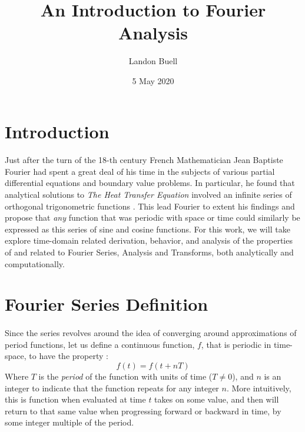 \documentclass[12pt,letterpaper]{article}
\begin{document}
\title{An Introduction to Fourier Analysis}
\author{Landon Buell}
\date{5 May 2020}
\maketitle


\section*{Introduction}
\paragraph*{}Just after the turn of the 18-th century French Mathematician Jean Baptiste Fourier had spent a great deal of his time in the subjects of various partial differential equations and boundary value problems. In particular, he found that analytical solutions to \textit{The Heat Transfer Equation} involved an infinite series of orthogonal trigonometric functions \cite{Pinsky,Olver}. This lead Fourier to extent his findings and propose that \textit{any} function that was periodic with space or time could similarly be expressed as this series of sine and cosine functions. For this work, we will take explore time-domain related derivation, behavior, and analysis of the properties of and related to Fourier Series, Analysis and Transforms, both analytically and computationally.



\section*{Fourier Series Definition}
\paragraph{}Since the series revolves around the idea of converging around approximations of period functions, let us define a continuous function, 
$f$, that is periodic in time-space, to have the property \cite{Tolstov}:
\begin{equation}
\label{periodic definition}
f(t) = f(t + nT)
\end{equation}
Where $T$ is the \textit{period} of the function with units of time ($T \neq 0$), and $n$ is an integer to indicate that the function repeats for any integer $n$. More intuitively, this is function when evaluated at time $t$ takes on some value, and then will return to that same value when progressing forward or backward in time, by some integer multiple of the period. 
\end{document}
